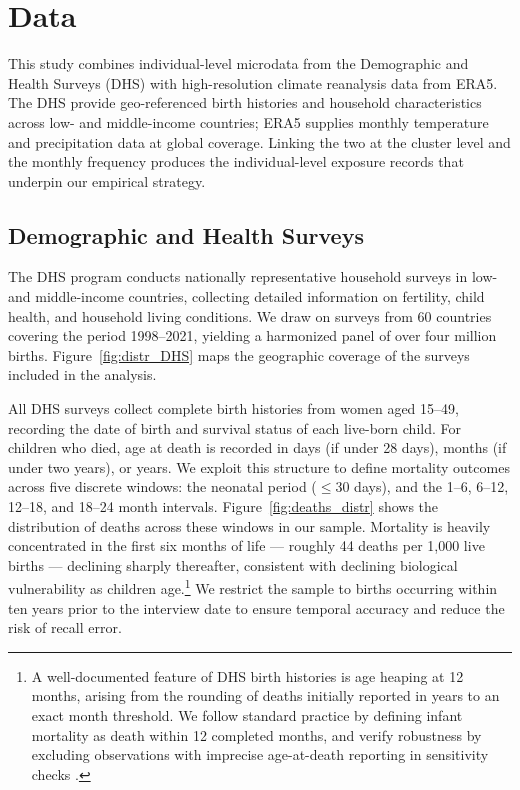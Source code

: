 \documentclass[a4paper]{article}
\begin{document}
\section{Data} \label{sec:data}

This study combines individual-level microdata from the Demographic and Health Surveys (DHS) with high-resolution climate reanalysis data from ERA5. The DHS provide geo-referenced birth histories and household characteristics across low- and middle-income countries; ERA5 supplies monthly temperature and precipitation data at global coverage. Linking the two at the cluster level and the monthly frequency produces the individual-level exposure records that underpin our empirical strategy.

\subsection{Demographic and Health Surveys} \label{sec:data_DHS}

The DHS program conducts nationally representative household surveys in low- and middle-income countries, collecting detailed information on fertility, child health, and household living conditions. We draw on surveys from 60 countries covering the period 1998--2021, yielding a harmonized panel of over four million births. Figure~\ref{fig:distr_DHS} maps the geographic coverage of the surveys included in the analysis.

All DHS surveys collect complete birth histories from women aged 15--49, recording the date of birth and survival status of each live-born child. For children who died, age at death is recorded in days (if under 28 days), months (if under two years), or years. We exploit this structure to define mortality outcomes across five discrete windows: the neonatal period ($\leq$30 days), and the 1--6, 6--12, 12--18, and 18--24 month intervals. Figure~\ref{fig:deaths_distr} shows the distribution of deaths across these windows in our sample. Mortality is heavily concentrated in the first six months of life — roughly 44 deaths per 1,000 live births — declining sharply thereafter, consistent with declining biological vulnerability as children age.\footnote{A well-documented feature of DHS birth histories is age heaping at 12 months, arising from the rounding of deaths initially reported in years to an exact month threshold. We follow standard practice by defining infant mortality as death within 12 completed months, and verify robustness by excluding observations with imprecise age-at-death reporting in sensitivity checks \parencite{gakidou2006}.} We restrict the sample to births occurring within ten years prior to the interview date to ensure temporal accuracy and reduce the risk of recall error.
\end{document}
